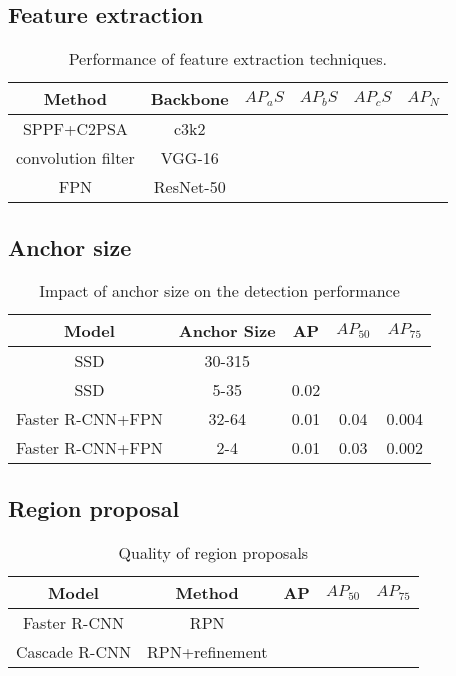 \documentclass{article}
\begin{document}
\subsection{Feature extraction}

\begin{table}[!htb]
\centering
\caption{Performance of feature extraction techniques.}
\begin{tabular}{c|ccccc}
\hline
Method&Backbone&$AP_aS$&$AP_bS$&$AP_cS$&$AP_N$\\
\hline\hline
SPPF+C2PSA&c3k2&&&&\\
convolution filter&VGG-16&&&&\\
FPN&ResNet-50&&&&\\
\hline
\end{tabular}\label{tb:Effective feature extraction}
\end{table}



\subsection{Anchor size}

\begin{table}[!htb]
\centering
\caption{Impact of anchor size on the detection performance}
\begin{tabular}{c|cccc}
\hline
Model&Anchor Size&AP&$AP_{50}$&$AP_{75}$\\
\hline\hline
SSD&30-315&&&\\
SSD&5-35&0.02&&\\
Faster R-CNN+FPN&32-64&0.01&0.04&0.004\\
Faster R-CNN+FPN&2-4&0.01&0.03&0.002\\
\hline
\end{tabular}\label{tb:Anchor sizes}
\end{table}



\subsection{Region proposal}

\begin{table}[!htb]
\centering
\caption{Quality of region proposals}
\begin{tabular}{c|cccc}
\hline
Model&Method&AP&$AP_{50}$&$AP_{75}$\\
\hline\hline
Faster R-CNN&RPN&&&\\
Cascade R-CNN&RPN+refinement&&&\\
\hline
\end{tabular}\label{tb:Effective feature extraction}
\end{table}
\end{document}
